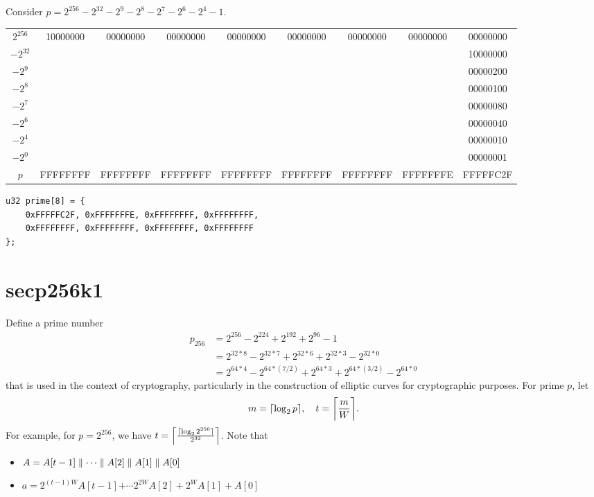 \newpage
\begin{example}[secp256k1]
Consider $p = 2^{256} - 2^{32} - 2^{9} - 2^{8} - 2^7 - 2^6 - 2^4 - 1$.
\begin{table}[h!]\centering\renewcommand{\arraystretch}{1.25}
{\ttfamily\footnotesize\begin{tabular*}{\textwidth}{@{\extracolsep{\fill}}ccccccccc}
		$2^{256}$ &  10000000 & 00000000 & 00000000 & 00000000 & 00000000 & 00000000 & 00000000 & 00000000\\
		$-2^{32}$ & & & & & & & & 10000000 \\
		$-2^{9}$ & & & & & & & & 00000200 \\
		$-2^{8}$ & & & & & & & & 00000100 \\
		$-2^{7}$ & & & & & & & & 00000080 \\
		$-2^{6}$ & & & & & & & & 00000040 \\
		$-2^{4}$ & & & & & & & & 00000010 \\
		$-2^{0}$ & & & & & & & & 00000001 \\ \cline{1-9}
		$p$ & FFFFFFFF & FFFFFFFF & FFFFFFFF & FFFFFFFF & FFFFFFFF & FFFFFFFF & FFFFFFFE & FFFFFC2F \\
\end{tabular*}}
\end{table}
\begin{lstlisting}[style=C]
u32 prime[8] = {
	0xFFFFFC2F, 0xFFFFFFFE, 0xFFFFFFFF, 0xFFFFFFFF,
	0xFFFFFFFF, 0xFFFFFFFF, 0xFFFFFFFF, 0xFFFFFFFF
};
\end{lstlisting}
\end{example}

\section{secp256k1}
Define a prime number \begin{align*}
p_{256} &= 2^{256}-2^{224}+2^{192}+2^{96}-1 \\
&=2^{32*8}-2^{32*7}+2^{32*6}+2^{32*3}-2^{32*0}\\
&= 2^{64*4}-2^{64*(7/2)}+2^{64*3}+2^{64*(3/2)}-2^{64*0}
\end{align*} that is used in the context of cryptography, particularly in the construction of elliptic curves for cryptographic purposes.
For prime $p$, let \begin{align*}
	m = \ceil*{\log_2 p},\quad t=\ceil*{\frac{m}{W}}.
\end{align*} For example, for $p=2^{256}$, we have $t=\ceil*{\frac{\ceil{\log_2 2^{256}}}{2^{32}}}$. Note that \begin{itemize}
\item $A = A[t-1]\adjacent\cdots\adjacent A[2]\adjacent A[1]\adjacent A[0]$
\item $a = 2^{(t-1)W}A[t-1]$+$\cdots 2^{2W}A[2]+2^{W}A[1]+A[0]$
\end{itemize}

